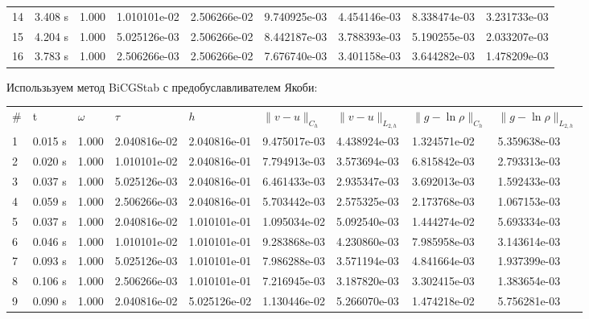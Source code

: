 \documentclass[12pt]{article}
\begin{document}
\begin{center}
\begin{tabular}{lllllllll}
14&      3.408 s&      1.000&      1.010101e-02&      2.506266e-02&      9.740925e-03&      4.454146e-03&      8.338474e-03&      3.231733e-03\\
15&      4.204 s&      1.000&      5.025126e-03&      2.506266e-02&      8.442187e-03&      3.788393e-03&      5.190255e-03&      2.033207e-03\\
16&      3.783 s&      1.000&      2.506266e-03&      2.506266e-02&      7.676740e-03&      3.401158e-03&      3.644282e-03&      1.478209e-03\\
\end{tabular}
\end{center}

Использьзуем метод BiCGStab с предобуславливателем Якоби:

\begin{center}
\begin{tabular}{lllllllll}
\# & t & $\omega$ & $\tau$ & $h$ & $\|v - u\|_{C_h}$ & $\|v - u\|_{L_{2,h}}$ & $\|g - \ln\rho\|_{C_h}$ & $\|g - \ln\rho\|_{L_{2,h}}$ \\
1&      0.015 s&      1.000&      2.040816e-02&      2.040816e-01&      9.475017e-03&      4.438924e-03&      1.324571e-02&      5.359638e-03\\
2&      0.020 s&      1.000&      1.010101e-02&      2.040816e-01&      7.794913e-03&      3.573694e-03&      6.815842e-03&      2.793313e-03\\
3&      0.037 s&      1.000&      5.025126e-03&      2.040816e-01&      6.461433e-03&      2.935347e-03&      3.692013e-03&      1.592433e-03\\
4&      0.059 s&      1.000&      2.506266e-03&      2.040816e-01&      5.703442e-03&      2.575325e-03&      2.173768e-03&      1.067153e-03\\
5&      0.037 s&      1.000&      2.040816e-02&      1.010101e-01&      1.095034e-02&      5.092540e-03&      1.444274e-02&      5.693334e-03\\
6&      0.046 s&      1.000&      1.010101e-02&      1.010101e-01&      9.283868e-03&      4.230860e-03&      7.985958e-03&      3.143614e-03\\
7&      0.093 s&      1.000&      5.025126e-03&      1.010101e-01&      7.986288e-03&      3.571194e-03&      4.841664e-03&      1.937399e-03\\
8&      0.106 s&      1.000&      2.506266e-03&      1.010101e-01&      7.216945e-03&      3.187820e-03&      3.302415e-03&      1.383654e-03\\
9&      0.090 s&      1.000&      2.040816e-02&      5.025126e-02&      1.130446e-02&      5.266070e-03&      1.474218e-02&      5.756281e-03\\

\end{tabular}
\end{center}
\end{document}
